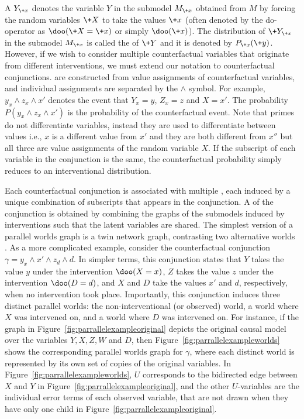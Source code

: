 A  \(Y_{\+ x}\) denotes the variable \(Y\) in the submodel \(M_{\+ x}\) obtained from \(M\) by forcing the random variables \(\+ X\) to take the values \(\+ x\) (often denoted by the do-operator as \(\doo(\+ X = \+ x)\) or simply \(\doo(\+ x)\)). The distribution of \(\+ Y_{\+ x}\) in the submodel \(M_{\+ x}\) is called the  of \(\+ Y\) and it is denoted by \(P_{\+ x}(\+ y)\). However, if we wish to consider multiple counterfactual variables that originate from different interventions, we must extend our notation to counterfactual conjunctions.  are constructed from value assignments of counterfactual variables, and individual assignments are separated by the \(\wedge\) symbol. For example, \(y_x \wedge z_x \wedge x'\) denotes the event that \(Y_x = y\), \(Z_x = z\) and \(X = x'\). The probability \(P(y_x \wedge z_x \wedge x')\) is the probability of the counterfactual event. Note that primes do not differentiate variables, instead they are used to differentiate between values i.e., \(x\) is a different value from \(x'\) and they are both different from \(x''\) but all three are value assignments of the random variable \(X\). If the subscript of each variable in the conjunction is the same, the counterfactual probability simply reduces to an interventional distribution.

Each counterfactual conjunction is associated with multiple , each induced by a unique combination of subscripts that appears in the conjunction. A  of the conjunction is obtained by combining the graphs of the submodels induced by interventions such that the latent variables are shared. The simplest version of a parallel worlds graph is a twin network graph, contrasting two alternative worlds \citep{balke1994a, balke1994b, avin2005pathspecific}. As a more complicated example, consider the counterfactual conjunction \(\gamma = y_x \wedge x' \wedge z_d \wedge d\). In simpler terms, this conjunction states that \(Y\) takes the value \(y\) under the intervention \(\doo(X = x)\), \(Z\) takes the value \(z\) under the intervention \(\doo(D = d)\), and \(X\) and \(D\) take the values \(x'\) and \(d\), respectively, when no intervention took place. Importantly, this conjunction induces three distinct parallel worlds: the non-interventional (or observed) world, a world where \(X\) was intervened on, and a world where \(D\) was intervened on. For instance, if the graph in Figure~\ref{fig:parrallelexampleoriginal} depicts the original causal model over the variables \(Y, X, Z, W\) and \(D\), then Figure~\ref{fig:parrallelexampleworlds} shows the corresponding parallel worlds graph for \(\gamma\), where each distinct world is represented by its own set of copies of the original variables. In Figure~\ref{fig:parrallelexampleworlds}, \(U\) corresponds to the bidirected edge between \(X\) and \(Y\) in Figure~\ref{fig:parrallelexampleoriginal}, and the other \(U\)-variables are the individual error terms of each observed variable, that are not drawn when they have only one child in Figure~\ref{fig:parrallelexampleoriginal}.

